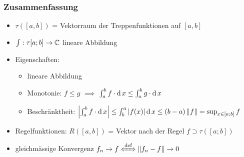 \subsubsection{Zusammenfassung}
\begin{itemize}
  \item $\tau\left( [a,b] \right)$ = Vektorraum der Treppenfunktionen auf $[a,b]$
  \item $\int: \tau[a;b]\to\mathbb{C}$ lineare Abbildung
  \item Eigenschaften:
    \begin{itemize}
      \item lineare Abbildung
      \item Monotonie: $f\leq g$ $\implies$ $\int^b_af\cdot \operatorname{d} x\leq \int^b_ag\cdot \operatorname{d} x$
      \item Beschränktheit: $\left| \int^b_af\cdot \operatorname{d} x \right|\leq \int^a_b\left| f(x) \right|\operatorname{d} x\leq (b-a)\left\| f \right\| = \sup_{x\in[a;b]}f$
    \end{itemize}
  \item Regelfunktionen: $R\left( [a,b] \right)$ = Vektor nach der Regel $f\supset\tau\left( [a;b] \right)$
  \item gleichmässige Konvergenz $f_n\to f\xLeftrightarrow{\text{def}}\Norm{f_n-f}\to 0$
\end{itemize}
